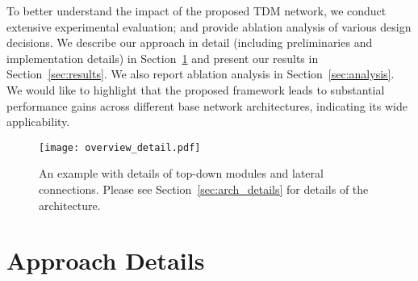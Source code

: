 \documentclass[10pt,twocolumn,letterpaper]{article}
\begin{document}
To better understand the impact of the proposed TDM network, we conduct extensive experimental evaluation; and provide ablation analysis of various design decisions. We describe our approach in detail (including preliminaries and implementation details) in Section~\ref{sec:details} and present our results in Section~\ref{sec:results}. We also report ablation analysis in Section~\ref{sec:analysis}. We would like to highlight that the proposed framework leads to substantial performance gains across different base network architectures, indicating its wide applicability.

\begin{figure}[t]
    \centering
    \texttt{[image: overview\_detail.pdf]}
    \caption{An example with details of top-down modules and lateral connections. Please see Section~\ref{sec:arch_details} for details of the architecture.}
    \vspace{-0.1in}
    \label{fig:overview_details}
\end{figure}


\section{Approach Details}\label{sec:details}
\end{document}
